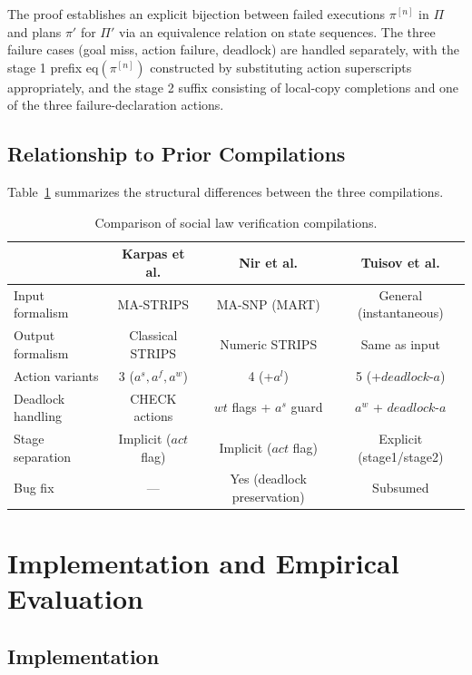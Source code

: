 \documentclass{article}
\theoremstyle{definition}
\newcommand{\act}{\mathit{act}}
\newcommand{\wt}{\mathit{wt}}
\begin{document}
The proof establishes an explicit bijection between failed executions $\pi^{[n]}$ in $\Pi$ and plans $\pi'$ for $\Pi'$ via an equivalence relation on state sequences. The three failure cases (goal miss, action failure, deadlock) are handled separately, with the stage 1 prefix $\mathrm{eq}(\pi^{[n]})$ constructed by substituting action superscripts appropriately, and the stage 2 suffix consisting of local-copy completions and one of the three failure-declaration actions.

\subsection{Relationship to Prior Compilations}

Table~\ref{tab:comparison} summarizes the structural differences between the three compilations.

\begin{table}[h]
\centering
\caption{Comparison of social law verification compilations.}
\label{tab:comparison}
\small
\begin{tabular}{@{}lccc@{}}
\toprule
 & \textbf{Karpas et al.} & \textbf{Nir et al.} & \textbf{Tuisov et al.} \\
\midrule
Input formalism & MA-STRIPS & MA-SNP (MART) & General (instantaneous) \\
Output formalism & Classical STRIPS & Numeric STRIPS & Same as input \\
Action variants & 3 ($a^s, a^f, a^w$) & 4 (+$a^l$) & 5 (+$\mathit{deadlock}\text{-}a$) \\
Deadlock handling & CHECK actions & $\wt$ flags + $a^s$ guard & $a^w$ + $\mathit{deadlock}\text{-}a$ \\
Stage separation & Implicit ($\act$ flag) & Implicit ($\act$ flag) & Explicit (stage1/stage2) \\
Bug fix & --- & Yes (deadlock preservation) & Subsumed \\
\bottomrule
\end{tabular}
\end{table}

\section{Implementation and Empirical Evaluation}

\subsection{Implementation}
\end{document}
